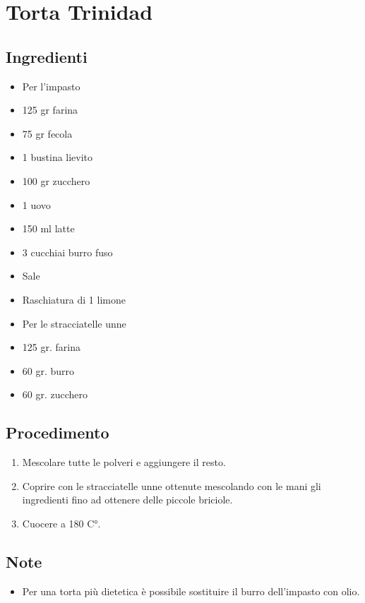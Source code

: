 \section{Torta Trinidad}
\subsection{Ingredienti}
\begin{itemize}
\item Per l'impasto  
\item 125 gr farina  
\item 75 gr fecola  
\item 1 bustina lievito   
\item 100 gr zucchero  
\item 1 uovo   
\item 150 ml latte  
\item 3 cucchiai burro fuso   
\item Sale  
\item Raschiatura di 1 limone  
\item Per le stracciatelle unne  
\item 125 gr. farina  
\item 60 gr. burro  
\item 60 gr. zucchero
\end{itemize}
\subsection{Procedimento}
\begin{enumerate}
\item  Mescolare tutte le polveri e aggiungere il resto.  
\item  Coprire con le stracciatelle unne ottenute mescolando con le mani gli ingredienti fino ad ottenere delle piccole briciole.  
\item  Cuocere a 180 C°.
\end{enumerate}
\subsection{Note}
\begin{itemize}
\item Per una torta più dietetica è possibile sostituire il burro dell'impasto con olio.
\end{itemize}
